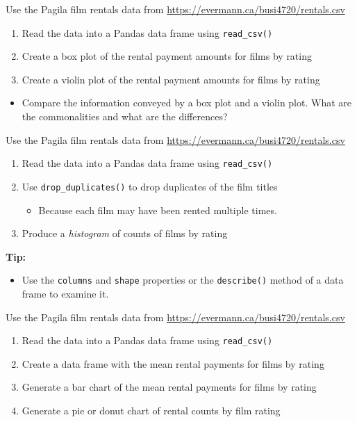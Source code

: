 \begin{withcode}
\begin{exerciseboxcomputer}
Use the Pagila film rentals data from \url{https://evermann.ca/busi4720/rentals.csv}
\begin{enumerate}
   \item Read the data into a Pandas data frame using \texttt{read\_csv()}
   \item Create a box plot of the rental payment amounts for films by rating
   \item Create a violin plot of the rental payment amounts for films by rating
\end{enumerate}
\begin{itemize}
\item Compare the information conveyed by a box plot and a violin plot. What are the commonalities and what are the differences?
\end{itemize}
\end{exerciseboxcomputer}

\begin{exerciseboxcomputer}
Use the Pagila film rentals data from \small\url{https://evermann.ca/busi4720/rentals.csv}\normalsize
\begin{enumerate}
   \item Read the data into a Pandas data frame using \texttt{read\_csv()}
   \item Use \texttt{drop\_duplicates()} to drop duplicates of the film titles
   \begin{itemize}
      \item Because each film may have been rented multiple times.
   \end{itemize}
   \item Produce a \emph{histogram} of counts of films by rating
\end{enumerate}
\vspace{\baselineskip}
\textbf{Tip:}
\begin{itemize}
\item Use the \texttt{columns} and \texttt{shape} properties or the \texttt{describe()} method of a data frame to examine it. 
\end{itemize}
\end{exerciseboxcomputer}

\begin{exerciseboxcomputer}
Use the Pagila film rentals data from \small\url{https://evermann.ca/busi4720/rentals.csv}\normalsize
\begin{enumerate}
   \item Read the data into a Pandas data frame using \texttt{read\_csv()}
   \item Create a data frame with the mean rental payments for films by rating
   \item Generate a bar chart of the mean rental payments for films by rating
   \item Generate a pie or donut chart of rental counts by film rating
\end{enumerate}


\end{exerciseboxcomputer}
\end{withcode}
